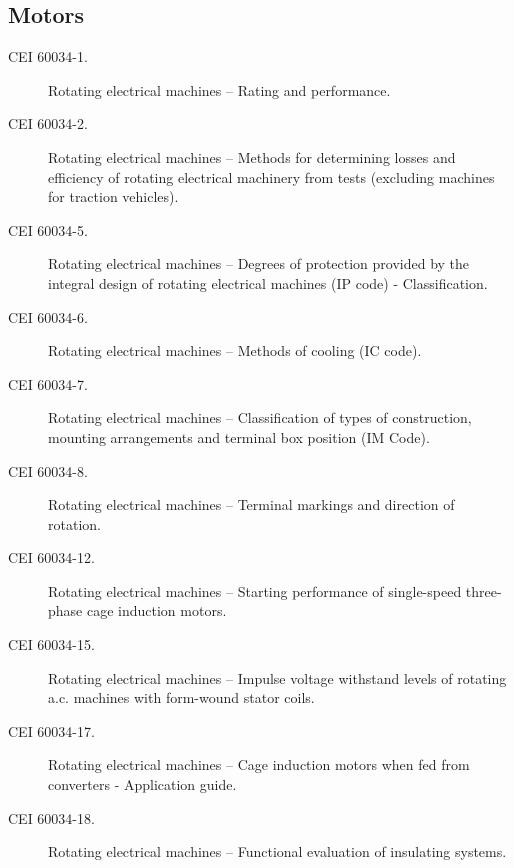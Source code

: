 \subsection*{Motors}
\begin{description}
    \item [\hspace{5mm}CEI 60034-1.] Rotating electrical machines -- Rating and performance.
    \item [\hspace{5mm}CEI 60034-2.] Rotating electrical machines -- Methods for determining losses and
efficiency of rotating electrical machinery from tests (excluding machines for traction vehicles).
    \item [\hspace{5mm}CEI 60034-5.] Rotating electrical machines -- Degrees of protection provided by the
integral design of rotating electrical machines (IP code) - Classification.
    \item [\hspace{5mm}CEI 60034-6.] Rotating electrical machines -- Methods of cooling (IC code).
    \item [\hspace{5mm}CEI 60034-7.] Rotating electrical machines -- Classification of types of construction, mounting arrangements and terminal box position (IM Code).
    \item [\hspace{5mm}CEI 60034-8.] Rotating electrical machines -- Terminal markings and direction of
rotation.
    \item [\hspace{5mm}CEI 60034-12.] Rotating electrical machines -- Starting performance of single-speed
three-phase cage induction motors.
    \item [\hspace{5mm}CEI 60034-15.] Rotating electrical machines -- Impulse voltage withstand levels of
rotating a.c. machines with form-wound stator coils.
    \item [\hspace{5mm}CEI 60034-17.] Rotating electrical machines -- Cage induction motors when fed from
converters - Application guide.
    \item [\hspace{5mm}CEI 60034-18.] Rotating electrical machines -- Functional evaluation of insulating
systems.
\end{description}

